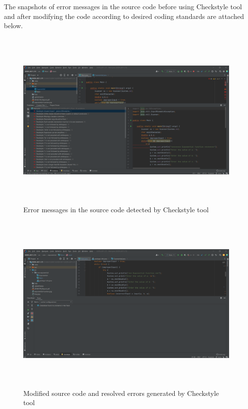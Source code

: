 \documentclass[12pt, a4paper]{article}
\begin{document}
\newpage

\noindent
The snapshots of error messages in the source code before using Checkstyle tool and after modifying the code according to desired coding standards are attached below. 

\begin{figure}[h]
  \includegraphics[width=15cm,height=9cm]{CheckStyle(Before).png}
  \caption{Error messages in the source code detected by Checkstyle tool}
  \label{fig:Debugging computation of exponential function}
\end{figure}


\begin{figure}[h!]
  \includegraphics[width=15cm,height=9cm]{CheckStyle(After).png}
  \caption{Modified source code and resolved errors generated by Checkstyle tool}
  \label{Debugging computation of fractional exponent value}
\end{figure}

\newpage
\end{document}
